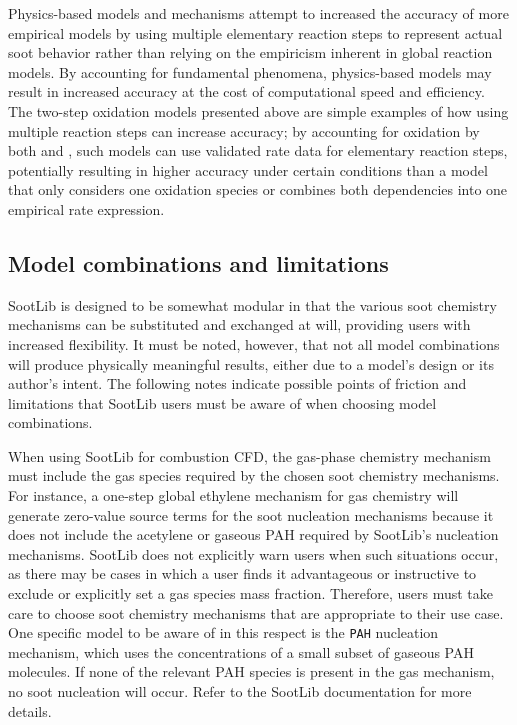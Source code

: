 \documentclass[preprint,letterpaper]{elsarticle}
\begin{document}
Physics-based models and mechanisms attempt to increased the accuracy of more empirical models by using multiple elementary reaction steps to represent actual soot behavior rather than relying on the empiricism inherent in global reaction models. By accounting for fundamental phenomena, physics-based models may result in increased accuracy at the cost of computational speed and efficiency. The two-step oxidation models presented above are simple examples of how using multiple reaction steps can increase accuracy; by accounting for oxidation by both  and , such models can use validated rate data for elementary reaction steps, potentially resulting in higher accuracy under certain conditions than a model that only considers one oxidation species or combines both dependencies into one empirical rate expression.

\subsection{Model combinations and limitations}
\label{ss:limitations}

SootLib is designed to be somewhat modular in that the various soot chemistry mechanisms can be substituted and exchanged at will, providing users with increased flexibility. It must be noted, however, that not all model combinations will produce physically meaningful results, either due to a model's design or its author's intent. The following notes indicate possible points of friction and limitations that SootLib users must be aware of when choosing model combinations.

When using SootLib for combustion CFD, the gas-phase chemistry mechanism must include the gas species required by the chosen soot chemistry mechanisms. For instance, a one-step global ethylene mechanism for gas chemistry will generate zero-value source terms for the soot nucleation mechanisms because it does not include the acetylene or gaseous PAH required by SootLib's nucleation mechanisms. SootLib does not explicitly warn users when such situations occur, as there may be cases in which a user finds it advantageous or instructive to exclude or explicitly set a gas species mass fraction. Therefore, users must take care to choose soot chemistry mechanisms that are appropriate to their use case. One specific model to be aware of in this respect is the \texttt{PAH} nucleation mechanism, which uses the concentrations of a small subset of gaseous PAH molecules. If none of the relevant PAH species is present in the gas mechanism, no soot nucleation will occur. Refer to the SootLib documentation for more details.
\end{document}
